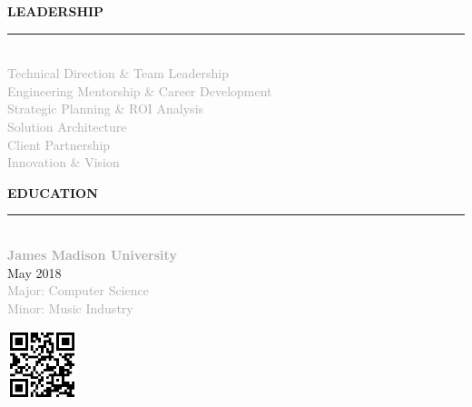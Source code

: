 \documentclass[10pt,letterpaper]{article}
\newcommand{\sidebarheader}[1]{%
    \vspace{6pt}
    {\headingfont\small\textcolor{accent}{\MakeUppercase{\textbf{#1}}}}
    \vspace{1pt}
    \par\noindent\textcolor{accent}{\rule{\linewidth}{1.5pt}}
    \vspace{2pt}
}
\begin{document}
{\begin{minipage}[t][10.885in][t]{2.7in}
\begin{minipage}{2.1in}
\sidebarheader{Leadership}
{\scriptsize\textcolor{darkgray}{\\[-6pt]
Technical Direction \& Team Leadership\\[3pt]
Engineering Mentorship \& Career Development\\[3pt]
Strategic Planning \& ROI Analysis\\[3pt]
Solution Architecture\\[3pt]
Client Partnership\\[3pt]
Innovation \& Vision\\[3pt]
}}

\sidebarheader{Education}
{\footnotesize\\[-6pt]
\textbf{\textcolor{darkgray}{James Madison University}}\\[3pt]
\textcolor{mediumgray}{May 2018}\\[3pt]
\textcolor{darkgray}{Major: Computer Science\\[3pt]
Minor: Music Industry\\[3pt]}
}

\vfill

\vspace{80pt}
\raggedright
\includegraphics[width=0.8in]{qr_code.png}\\[3pt]

\vspace{10pt}

\end{minipage}
\end{minipage}%
}%
\hspace{0pt}%
\end{document}
